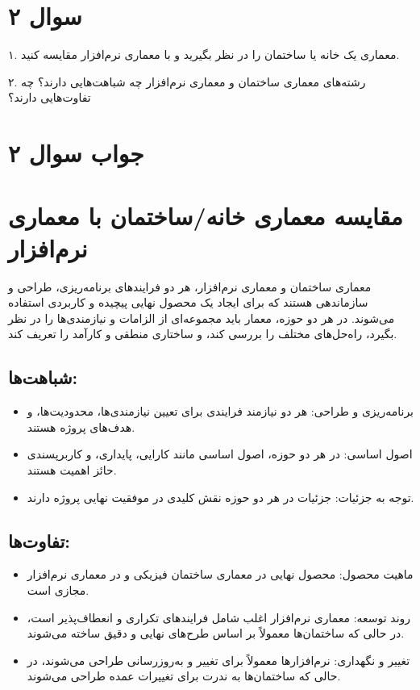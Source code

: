 \section*{سوال ۲}

۱. معماری یک خانه یا ساختمان را در نظر بگیرید و با معماری نرم‌افزار مقایسه کنید.

۲. رشته‌های معماری ساختمان و معماری نرم‌افزار چه شباهت‌هایی دارند؟ چه تفاوت‌هایی دارند؟

\section*{جواب سوال ۲}

\section*{مقایسه معماری خانه/ساختمان با معماری نرم‌افزار}
معماری ساختمان و معماری نرم‌افزار، هر دو فرایندهای برنامه‌ریزی، طراحی و سازماندهی هستند که برای ایجاد یک محصول نهایی پیچیده و کاربردی استفاده می‌شوند. در هر دو حوزه، معمار باید مجموعه‌ای از الزامات و نیازمندی‌ها را در نظر بگیرد، راه‌حل‌های مختلف را بررسی کند، و ساختاری منطقی و کارآمد را تعریف کند.

\subsection*{شباهت‌ها:}
\begin{itemize}
	\item برنامه‌ریزی و طراحی: هر دو نیازمند فرایندی برای تعیین نیازمندی‌ها، محدودیت‌ها، و هدف‌های پروژه هستند.
	\item اصول اساسی: در هر دو حوزه، اصول اساسی مانند کارایی، پایداری، و کاربرپسندی حائز اهمیت هستند.
	\item توجه به جزئیات: جزئیات در هر دو حوزه نقش کلیدی در موفقیت نهایی پروژه دارند.
\end{itemize}

\subsection*{تفاوت‌ها:}
\begin{itemize}
	\item ماهیت محصول: محصول نهایی در معماری ساختمان فیزیکی و در معماری نرم‌افزار مجازی است.
	\item روند توسعه: معماری نرم‌افزار اغلب شامل فرایندهای تکراری و انعطاف‌پذیر است، در حالی که ساختمان‌ها معمولاً بر اساس طرح‌های نهایی و دقیق ساخته می‌شوند.
	\item تغییر و نگهداری: نرم‌افزارها معمولاً برای تغییر و به‌روزرسانی طراحی می‌شوند، در حالی که ساختمان‌ها به ندرت برای تغییرات عمده طراحی می‌شوند.
\end{itemize}

